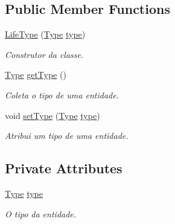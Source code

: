 \subsection*{Public Member Functions}
\begin{DoxyCompactItemize}
\item 
\hyperlink{classbr_1_1unb_1_1unbomber_1_1component_1_1_life_type_a0b6eb7380605c8070e4a242ce419075f}{Life\+Type} (\hyperlink{enumbr_1_1unb_1_1unbomber_1_1component_1_1_life_type_1_1_type}{Type} \hyperlink{classbr_1_1unb_1_1unbomber_1_1component_1_1_life_type_a0eef757b0cf6ff6b8b740b93f2a0bfa0}{type})
\begin{DoxyCompactList}\small\item\em Construtor da classe. \end{DoxyCompactList}\item 
\hyperlink{enumbr_1_1unb_1_1unbomber_1_1component_1_1_life_type_1_1_type}{Type} \hyperlink{classbr_1_1unb_1_1unbomber_1_1component_1_1_life_type_abcffdd61a42b2e8873bdb76534895283}{get\+Type} ()
\begin{DoxyCompactList}\small\item\em Coleta o tipo de uma entidade. \end{DoxyCompactList}\item 
void \hyperlink{classbr_1_1unb_1_1unbomber_1_1component_1_1_life_type_a1ee819dcf2cd26cee707ce4db48a1178}{set\+Type} (\hyperlink{enumbr_1_1unb_1_1unbomber_1_1component_1_1_life_type_1_1_type}{Type} \hyperlink{classbr_1_1unb_1_1unbomber_1_1component_1_1_life_type_a0eef757b0cf6ff6b8b740b93f2a0bfa0}{type})
\begin{DoxyCompactList}\small\item\em Atribui um tipo de uma entidade. \end{DoxyCompactList}\end{DoxyCompactItemize}
\subsection*{Private Attributes}
\begin{DoxyCompactItemize}
\item 
\hyperlink{enumbr_1_1unb_1_1unbomber_1_1component_1_1_life_type_1_1_type}{Type} \hyperlink{classbr_1_1unb_1_1unbomber_1_1component_1_1_life_type_a0eef757b0cf6ff6b8b740b93f2a0bfa0}{type}
\begin{DoxyCompactList}\small\item\em O tipo da entidade. \end{DoxyCompactList}\end{DoxyCompactItemize}


